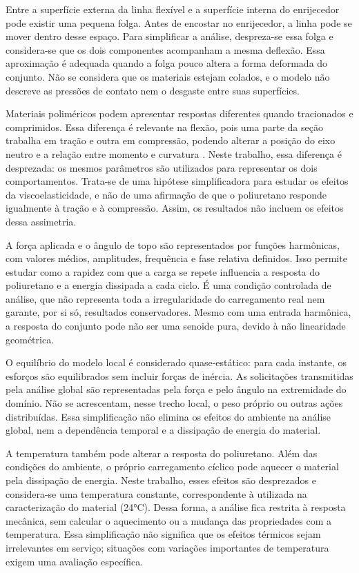 \documentclass[arial,centeredequations,english,brazilian,oneside,section=TITLE]{ifes8}
\begin{document}
Entre a superfície externa da linha flexível e a superfície interna do enrijecedor pode existir
uma pequena folga. Antes de encostar no enrijecedor, a linha pode se mover dentro desse espaço.
Para simplificar a análise, despreza-se essa folga e considera-se que os dois componentes
acompanham a mesma deflexão. Essa aproximação é adequada quando a folga pouco altera a forma
deformada do conjunto. Não se considera que os materiais estejam colados, e o modelo não
descreve as pressões de contato nem o desgaste entre suas superfícies.

Materiais poliméricos podem apresentar respostas diferentes quando tracionados e comprimidos.
Essa diferença é relevante na flexão, pois uma parte da seção trabalha em tração e outra em
compressão, podendo alterar a posição do eixo neutro e a relação entre momento e curvatura
\cite{Caire2011}. Neste trabalho, essa diferença é desprezada: os mesmos parâmetros
são utilizados para representar os dois comportamentos. Trata-se de uma hipótese simplificadora
para estudar os efeitos da viscoelasticidade, e não de uma afirmação de que o poliuretano
responde igualmente à tração e à compressão. Assim, os resultados não incluem os efeitos
dessa assimetria.

A força aplicada e o ângulo de topo são representados por funções harmônicas, com valores
médios, amplitudes, frequência e fase relativa definidos. Isso permite estudar como a rapidez
com que a carga se repete influencia a resposta do poliuretano e a energia dissipada a cada
ciclo. É uma condição controlada de análise, que não representa toda a irregularidade do
carregamento real nem garante, por si só, resultados conservadores. Mesmo com uma entrada
harmônica, a resposta do conjunto pode não ser uma senoide pura, devido à não linearidade
geométrica.

O equilíbrio do modelo local é considerado quase-estático: para cada instante, os
esforços são equilibrados sem incluir forças de inércia. As solicitações transmitidas
pela análise global são representadas pela força e pelo ângulo na extremidade do
domínio. Não se acrescentam, nesse trecho local, o peso próprio ou outras ações
distribuídas. Essa simplificação não elimina os efeitos do ambiente na análise global,
nem a dependência temporal e a dissipação de energia do material.

A temperatura também pode alterar a resposta do poliuretano. Além das condições do ambiente,
o próprio carregamento cíclico pode aquecer o material pela dissipação de energia. Neste
trabalho, esses efeitos são desprezados e considera-se uma temperatura constante, correspondente
à utilizada na caracterização do material (24°C). Dessa forma, a análise fica restrita à resposta
mecânica, sem calcular o aquecimento ou a mudança das propriedades com a temperatura.
Essa simplificação não significa que os efeitos térmicos sejam irrelevantes em serviço;
situações com variações importantes de temperatura exigem uma avaliação específica.
\end{document}
